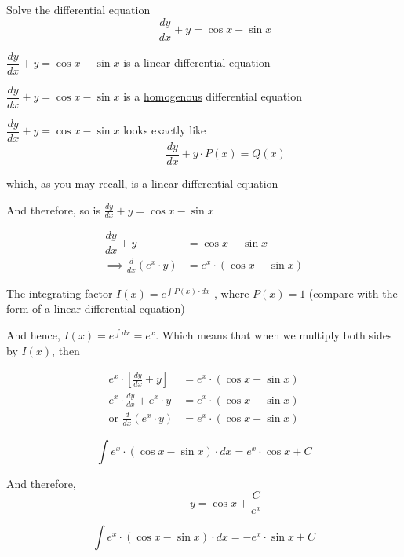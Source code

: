 \documentclass[14pt,fleqn]{extarticle}
\begin{document}
Solve the differential equation
\[ \qquad \frac{dy}{dx} + y = \cos x - \sin x \]
%

\newcard

$\dfrac{dy}{dx} + y = \cos x - \sin x$ is a \underline{linear} differential equation 

\newcard 

$\dfrac{dy}{dx} + y = \cos x - \sin x$ is a \underline{homogenous} differential equation

\newcard 

$\dfrac{dy}{dx} + y = \cos x - \sin x$ looks exactly like
\[ \qquad\qquad \frac{dy}{dx} + y\cdot P(x) = Q(x) \]

which, as you may recall, is a \underline{linear} differential equation \newline 

And therefore, so is $\frac{dy}{dx} + y = \cos x-\sin x$ 

\newcard 

\begin{align}
	\dfrac{dy}{dx} + y &= \cos x - \sin x \\
	\implies \frac{d}{dx} \left(e^x\cdot y \right) &= e^x\cdot \left(\cos x - \sin x \right)
\end{align}

\newcard 

The \underline{integrating factor} $I(x) = e^{\int P(x)\cdot dx}$ , where $P(x) = 1$ (compare with the form of a linear differential equation) \newline 

And hence, $I(x) = e^{\int dx} = e^x$. Which means that when we multiply both sides by $I(x)$, then 

\begin{align}
e^x\cdot \left[\frac{dy}{dx} + y \right] &= e^x\cdot \left(\cos x - \sin x \right) \\
e^x\cdot\frac{dy}{dx} + e^x\cdot y &= e^x\cdot \left(\cos x - \sin x \right) \\
\text{or } \frac{d}{dx} \left(e^x\cdot y \right) &= e^x\cdot \left(\cos x - \sin x \right)
\end{align}

\newcard 
\[ \int e^x\cdot \left(\cos x - \sin x \right)\cdot dx = e^x\cdot \cos x + C \]

And therefore, 
\[ \qquad \qquad y = \cos x + \dfrac{C}{e^x} \]

\newcard 
\[ \int e^x\cdot \left(\cos x - \sin x \right)\cdot dx = -e^x\cdot \sin x + C \]
\end{document}
